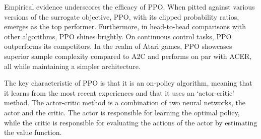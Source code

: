 Empirical evidence underscores the efficacy of PPO. When pitted against various versions of the surrogate objective, PPO, with its clipped probability ratios, emerges as the top performer. Furthermore, in head-to-head comparisons with other algorithms, PPO shines brightly. On continuous control tasks, PPO outperforms its competitors. In the realm of Atari games, PPO showcases superior sample complexity compared to A2C and performs on par with ACER, all while maintaining a simpler architecture.

The key characteristic of PPO is that it is an on-policy algorithm, meaning that it learns from the most recent experiences and that it uses an `actor-critic' method. The actor-critic method is a combination of two neural networks, the actor and the critic. The actor is responsible for learning the optimal policy, while the critic is responsible for evaluating the actions of the actor by estimating the value function.  

